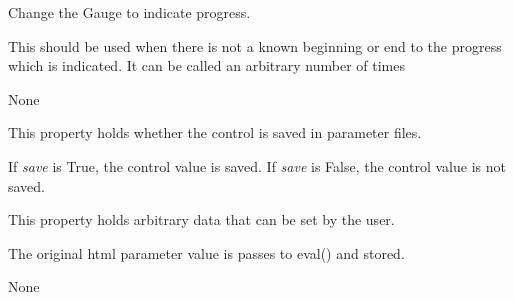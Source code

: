 \documentclass[letterpaper,10pt,english]{sphinxmanual}
\begin{document}
\begin{fulllineitems}

\begin{fulllineitems}
\label{api:qwt.Gauge.pulse}
Change the Gauge to indicate progress.

This should be used when there is not a known beginning or end to the 
progress which is indicated. It can be called an arbitrary number of 
times

\end{fulllineitems}


\begin{fulllineitems}
\label{api:qwt.Gauge.range}
None

\end{fulllineitems}


\begin{fulllineitems}
\label{api:qwt.Gauge.save}
This property holds whether the control is saved in parameter files.

If \emph{save} is True, the control value is saved.
If \emph{save} is False, the control value is not saved.

\end{fulllineitems}


\begin{fulllineitems}
\label{api:qwt.Gauge.user}
This property holds arbitrary data that can be set by the user.

The original html parameter value is passes to eval() and stored.

\end{fulllineitems}


\begin{fulllineitems}
\label{api:qwt.Gauge.value}
None

\end{fulllineitems}


\end{fulllineitems}

\end{document}
